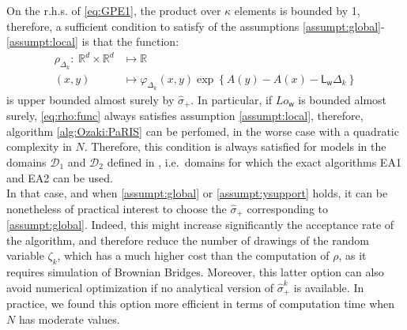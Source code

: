 \documentclass[12pt]{article}
\newcommand{\eqsp}{\;}
\newcommand{\1}{\mathrm{1}}
\newcommand{\mw}{\mathsf{w}}%
\newcommand{\Lo}{\mathsf{L}}
\begin{document}
On the r.h.s. of \eqref{eq:GPE1}, the product over $\kappa$ elements is bounded by 1, therefore, a sufficient condition to satisfy of the assumptions \eqref{assumpt:global}-\eqref{assumpt:local} is that the function:
\begin{align}
\rho_{\Delta_k}:\eqsp\mathbb{R}^d\times \mathbb{R}^d &\mapsto \mathbb{R}\nonumber\\
(x,y)&\mapsto \varphi_{\Delta_k}(x,y) \exp \left\{A(y) - A(x)- \Lo_\mw\Delta_k \right\}\label{eq:rho:func}
\end{align}
is upper bounded almost surely by $\hat{\sigma}_+$.
In particular, if $Lo_\mw$ is bounded almost surely, \eqref{eq:rho:func} always satisfies assumption \eqref{assumpt:local}, therefore, algorithm \eqref{alg:Ozaki:PaRIS} can be perfomed, in the worse case with a quadratic complexity in $N$. Therefore, this condition is always satisfied for models in the domains $\mathcal{D}_1$ and $\mathcal{D}_2$ defined in \cite{beskos:papaspiliopoulos:roberts:fearnhead:2006}, i.e.\ domains for which the exact algorithms EA1 and EA2 can be used.\\ 
In that case, and when \eqref{assumpt:global} or \eqref{assumpt:ysupport} holds, it can be nonetheless of practical interest to choose the $\hat{\sigma}_+$ corresponding to \eqref{assumpt:global}. Indeed, this might increase significantly the acceptance rate of the algorithm, and therefore reduce the number of drawings of the random variable $\zeta_k$, which has a much higher cost than the computation of $\rho$, as it requires simulation of Brownian Bridges. 
Moreover, this latter option can also avoid numerical optimization if no analytical version of $\hat{\sigma}_+^k$ is available. In practice, we found this option more efficient in terms of computation time when $N$ has moderate values. 
\end{document}
